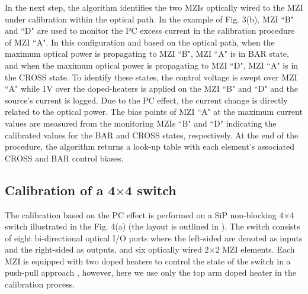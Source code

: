 In the next step, the algorithm identifies the two MZIs optically wired to the MZI under calibration within the optical path. In the example of Fig. 3(b),  MZI ``B" and ``D" are used to monitor the PC excess current in the calibration procedure of MZI ``A". In this configuration and based on the optical path, when the maximum optical power is propagating to MZI ``B", MZI ``A" is in BAR state, and when the maximum optical power is propagating to MZI ``D", MZI ``A" is in the CROSS state. To identify these states, the control voltage is swept over MZI ``A" while 1V over the doped-heaters is applied on the MZI ``B" and ``D" and the source's current is logged. Due to the PC effect, the current change is directly related to the optical power. The bias points of MZI ``A" at the maximum current values are measured from the monitoring MZIs ``B"  and ``D" indicating the calibrated values for the BAR and CROSS states, respectively. At the end of the procedure, the algorithm returns a look-up table with each element's associated CROSS and BAR control biases.  

\subsection{Calibration of a 4$\times$4 switch}
The calibration based on the PC effect is performed on a SiP non-blocking 4$\times$4 switch illustrated in the Fig. 4(a) (the layout is outlined in \cite{Qixiang_smart_routing}). The switch consists of eight bi-directional optical I/O ports where the left-sided are denoted as inputs and the right-sided as outputs, and six optically wired 2$\times$2 MZI elements. Each MZI is equipped with two doped heaters to control the state of the switch in a push-pull approach \cite{Yishen_Push_Pull}, however, here we use only the top arm doped heater in the calibration process. 

